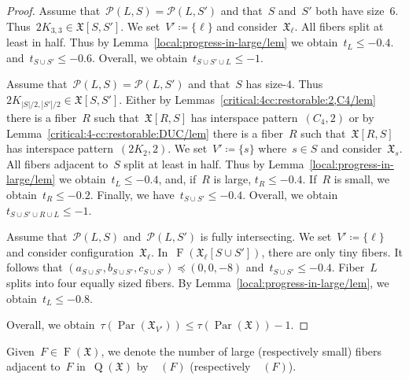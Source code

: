 \documentclass[english,a4paper]{article}
\theoremstyle{plain}
\theoremstyle{definition}
\DeclareMathOperator{\Fibers}{F}
\newcommand{\coherentConfig}{\ensuremath{\mathfrak{X}}}
\newcommand{\fibers}[1]{\ensuremath{\Fibers \left( #1 \right)}}
\newcommand{\interspace}[2]{\ensuremath{\coherentConfig[#1,#2]}}
\DeclareMathOperator*{\Quotient}{Q}
\newcommand{\quotientGraph}[1]{\ensuremath{\Quotient(#1)}}
\DeclareMathOperator{\ColorDegLarge}{cdeg_L}
\DeclareMathOperator{\ColorDegSmall}{cdeg_S}
\newcommand{\colorDegLarge}[1]{\ensuremath{\ColorDegLarge\left(#1\right)}}
\newcommand{\colorDegSmall}[1]{\ensuremath{\ColorDegSmall\left(#1\right)}}
\newcommand{\equivalenceClasses}[1]{\ensuremath{\mathcal{P}(#1)}}
\DeclareMathOperator{\parameters}{Par}
\newcommand{\ipfourMatching}{\ensuremath{(\disjointCliques{2}{2},2)}}
\newcommand{\ipfourCycle}   {\ensuremath{(\cycle{4},2)}}
\newcommand{\clique}[1]{\ensuremath{K_{#1}}}
\newcommand{\cycle}[1]{\ensuremath{C_{#1}}}
\newcommand{\disjointCliques}[2]{\ensuremath{#1 \clique{#2}}}
\begin{document}
\begin{proof}
    Assume that~$\equivalenceClasses{L,S} = \equivalenceClasses{L,S'}$ and that~$S$ and~$S'$ both have size~$6$.
    Thus~$\disjointCliques{2}{3,3} \in \interspace{S}{S'}$.
    We set~$V' \coloneqq \{\ell\}$ and consider~$\coherentConfig_\ell$.
    All fibers split at least in half.
    Thus by Lemma~\ref{local:progress-in-large/lem} we obtain~$t_L \leq -0.4$.
    and~$t_{S \cup S'} \leq -0.6$.
    Overall, we obtain~$t_{S \cup S'\cup L} \leq -1$.

    Assume that~$\equivalenceClasses{L,S} = \equivalenceClasses{L,S'}$ and that~$S$ has size-$4$.
    Thus~$\disjointCliques{2}{|S|/2,|S'|/2} \in \interspace{S}{S'}$.
    Either by Lemmas~\ref{critical:4cc:restorable:2,C4/lem} there is a fiber~$R$ such that~$\interspace{R}{S}$ has interspace pattern~$\ipfourCycle$ or by Lemma~\ref{critical:4-cc:restorable:DUC/lem} there is a fiber~$R$ such that~$\interspace{R}{S}$ has interspace pattern~$\ipfourMatching$.
    We set~$V' \coloneqq \{s\}$ where~$s \in S$ and consider~$\coherentConfig_s$.
    All fibers adjacent to~$S$ split at least in half.
    Thus by Lemma~\ref{local:progress-in-large/lem} we obtain~$t_L \leq -0.4$, and, if~$R$ is large, $t_R \leq -0.4$.
    If~$R$ is small, we obtain~$t_R  \leq -0.2$.
    Finally, we have~$t_{S \cup S'} \leq -0.4$.
    Overall, we obtain~$t_{S \cup S' \cup R \cup L} \leq -1$.


    Assume that~$\equivalenceClasses{L, S}$ and~$\equivalenceClasses{L, S'}$ is fully intersecting.
    We set~$V' \coloneqq \{\ell\}$ and consider configuration~$\coherentConfig_\ell$.
    In~$\fibers{\coherentConfig_\ell[S \cup S']}$, there are only tiny fibers.
    It follows that $(a_{S \cup S'},b_{S \cup S'}, c_{S \cup S'}) \preceq (0,0,-8)$ and~$t_{S \cup S'} \leq - 0.4$.
    Fiber~$L$ splits into four equally sized fibers.
    By Lemma~\ref{local:progress-in-large/lem}, we obtain~$t_L \leq -0.8$.

    Overall, we obtain~$\tau(\parameters(\coherentConfig_{V'})) \leq \tau(\parameters(\coherentConfig))- 1$.
\end{proof}










Given~$F \in \fibers{\coherentConfig}$, we denote the number of large (respectively small) fibers adjacent to~$F$ in~$\quotientGraph{\coherentConfig}$ by~$\colorDegLarge{F}$ (respectively~$\colorDegSmall{F}$).
\end{document}
